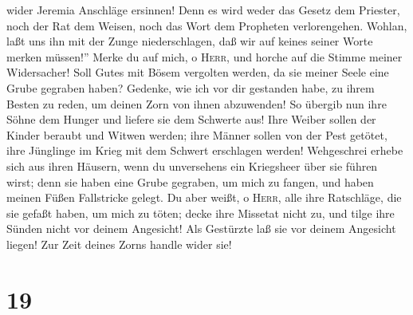 wider Jeremia Anschläge ersinnen! Denn es wird weder das Gesetz dem
Priester, noch der Rat dem Weisen, noch das Wort dem Propheten
verlorengehen. Wohlan, laßt uns ihn mit der Zunge niederschlagen, daß
wir auf keines seiner Worte merken müssen!''  Merke du
auf mich, o \textsc{Herr}, und horche auf die Stimme meiner Widersacher!
 Soll Gutes mit Bösem vergolten werden, da sie meiner
Seele eine Grube gegraben haben? Gedenke, wie ich vor dir gestanden
habe, zu ihrem Besten zu reden, um deinen Zorn von ihnen abzuwenden!
 So übergib nun ihre Söhne dem Hunger und liefere sie dem
Schwerte aus! Ihre Weiber sollen der Kinder beraubt und Witwen werden;
ihre Männer sollen von der Pest getötet, ihre Jünglinge im Krieg mit dem
Schwert erschlagen werden!  Wehgeschrei erhebe sich aus
ihren Häusern, wenn du unversehens ein Kriegsheer über sie führen wirst;
denn sie haben eine Grube gegraben, um mich zu fangen, und haben meinen
Füßen Fallstricke gelegt.  Du aber weißt, o
\textsc{Herr}, alle ihre Ratschläge, die sie gefaßt haben, um mich zu
töten; decke ihre Missetat nicht zu, und tilge ihre Sünden nicht vor
deinem Angesicht! Als Gestürzte laß sie vor deinem Angesicht liegen! Zur
Zeit deines Zorns handle wider sie!

\hypertarget{section-18}{%
\section{19}\label{section-18}}

